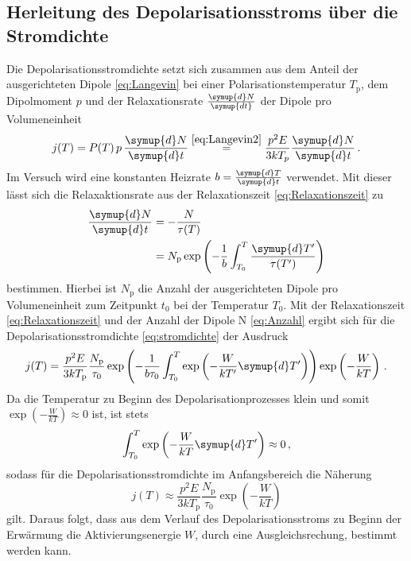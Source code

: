 \subsection{Herleitung des Depolarisationsstroms über die Stromdichte}
\label{sec:stromdichte}
Die Depolarisationsstromdichte setzt sich zusammen aus dem Anteil der ausgerichteten Dipole \eqref{eq:Langevin} bei einer Polarisationstemperatur $T_\text{p}$, dem Dipolmoment $p$ und der Relaxationsrate $\frac{\symup{d}N}{\symup{dt}}$ der Dipole pro Volumeneinheit
\begin{equation}
    j(T)=P(T)\, p \,\frac{\symup{d}N}{\symup{d}t} \stackrel{\eqref{eq:Langevin2}}{=} \frac{p^2 E}{3kT_p}\frac{\symup{d}N}{\symup{d}t} \, .
    \label{eq:stromdichte}
\end{equation}
Im Versuch wird eine konstanten Heizrate $b = \frac{\symup{d}T}{\symup{d}t}$ verwendet.
Mit dieser lässt sich die Relaxaktionsrate aus der Relaxationszeit \eqref{eq:Relaxationszeit} zu
\begin{align}
    \frac{\symup{d}N}{\symup{d}t} & = -\frac{N}{\tau(T)}\notag \\
    & = N_\text{p}\exp\left(-\frac{1}{b}\int_{T_0}^T \frac{\symup{d}T'}{\tau(T')}\right)
    \label{eq:Anzahl}
\end{align}
bestimmen.
Hierbei ist $N_\text{p}$ die Anzahl der ausgerichteten Dipole pro Volumeneinheit zum Zeitpunkt $t_0$ bei der Temperatur $T_0$.
Mit der Relaxationszeit \eqref{eq:Relaxationszeit} und der Anzahl der Dipole N \eqref{eq:Anzahl} ergibt sich für die Depolarisationsstromdichte \eqref{eq:stromdichte} der Ausdruck
\begin{equation}\label{eq:stromdichte2}
    j(T)= \frac{p^2E}{3kT_\text{p}}\frac{N_\text{p}}{\tau_0}\exp\left(-\frac{1}{b\tau_0}\int_{T_0}^T \exp\left(-\frac{W}{kT'}\symup{d}T'\right) \right)\exp\left(-\frac{W}{kT}\right)\, .
\end{equation}
Da die Temperatur zu Beginn des Depolarisationprozesses klein und somit $\exp(-\frac{W}{kT})\approx 0$ ist, ist stets
\begin{equation*}
    \int_{T_0}^T \exp\left(-\frac{W}{kT}\symup{d}T' \right) \approx 0\, ,
\end{equation*}
sodass für die Depolarisationsstromdichte im Anfangsbereich die Näherung
\begin{equation}
    j(T) \approx \frac{p^2 E}{3kT_\text{p}}\frac{N_\text{p}}{\tau_0}\exp\left(-\frac{W}{kT}\right)
    \label{eq:anlauf}
\end{equation}
gilt.
Daraus folgt, dass aus dem Verlauf des Depolarisationsstroms zu Beginn der Erwärmung die Aktivierungsenergie $W$, durch eine Ausgleichsrechung, bestimmt werden kann.
